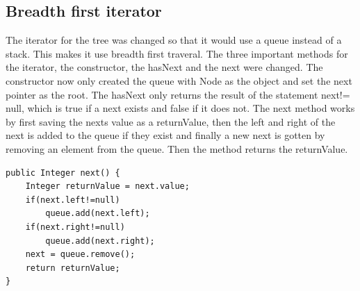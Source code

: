 \documentclass[a4paper,11pt]{article}
\begin{document}
\subsection*{Breadth first iterator}
The iterator for the tree was changed so that it would use a queue instead of a stack. This makes it use breadth first traveral. The three important methods for the iterator, the constructor, the hasNext and the next were changed. 
The constructor now only created the queue with Node as the object and set the next pointer as the root. The hasNext only returns the result of the statement next!= null, which is true if a next exists and false if it does not.
The next method works by first saving the nexts value as a returnValue, then the left and right of the next is added to the queue if they exist and finally a new next is gotten by removing an element from the queue. Then the method returns the returnValue.
\begin{verbatim}
public Integer next() {
    Integer returnValue = next.value;
    if(next.left!=null)
        queue.add(next.left);
    if(next.right!=null)
        queue.add(next.right);
    next = queue.remove();
    return returnValue;
}
\end{verbatim}
\end{document}
